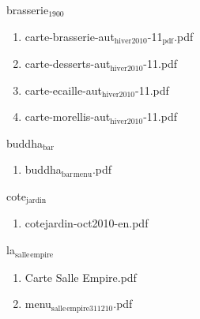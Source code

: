 \documentclass[11pt]{article}
\begin{document}

\item brasserie$_{\text{1900}}$
\label{sec-1-1-1-1-21-10-5-4}
\begin{enumerate}
\item carte-brasserie-aut$_{\text{hiver2010}}$-11$_{\text{pdf}}$.pdf
\label{sec-1-1-1-1-21-10-5-4-1}

\item carte-desserts-aut$_{\text{hiver2010}}$-11.pdf
\label{sec-1-1-1-1-21-10-5-4-2}

\item carte-ecaille-aut$_{\text{hiver2010}}$-11.pdf
\label{sec-1-1-1-1-21-10-5-4-3}

\item carte-morellis-aut$_{\text{hiver2010}}$-11.pdf
\label{sec-1-1-1-1-21-10-5-4-4}
\end{enumerate}

\item buddha$_{\text{bar}}$
\label{sec-1-1-1-1-21-10-5-5}
\begin{enumerate}
\item buddha$_{\text{bar}}$$_{\text{menu}}$.pdf
\label{sec-1-1-1-1-21-10-5-5-1}
\end{enumerate}

\item cote$_{\text{jardin}}$
\label{sec-1-1-1-1-21-10-5-6}
\begin{enumerate}
\item cotejardin-oct2010-en.pdf
\label{sec-1-1-1-1-21-10-5-6-1}
\end{enumerate}

\item la$_{\text{salle}}$$_{\text{empire}}$
\label{sec-1-1-1-1-21-10-5-7}
\begin{enumerate}
\item Carte Salle Empire.pdf
\label{sec-1-1-1-1-21-10-5-7-1}

\item menu$_{\text{salle}}$$_{\text{empire311210}}$.pdf
\label{sec-1-1-1-1-21-10-5-7-2}
\end{enumerate}
\end{document}
